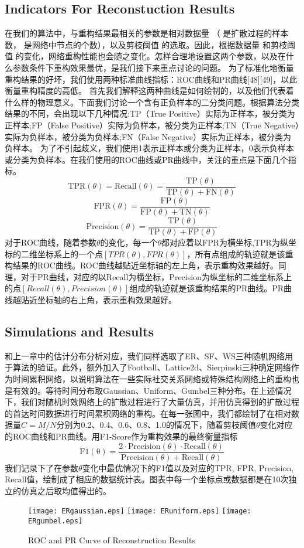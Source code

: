 \documentclass[journal]{IEEEtran}
\begin{document}
{	\subsection{Indicators For Reconstuction Results}
	在我们的算法中，与重构结果最相关的参数是相对数据量 （ 是扩散过程的样本数， 是网络中节点的个数），以及剪枝阈值 的选取。因此，根据数据量 和剪枝阈值 的变化，网络重构性能也会随之变化。怎样合理地设置这两个参数，以及在什么参数条件下重构效果最优，是我们接下来重点讨论的问题。
	为了标准化地衡量重构结果的好坏，我们使用两种标准曲线指标：ROC曲线和PR曲线[48][49]，以此衡量重构精度的高低。
	首先我们解释这两种曲线是如何绘制的，以及他们代表着什么样的物理意义。下面我们讨论一个含有正负样本的二分类问题。根据算法分类结果的不同，会出现以下几种情况:TP（True Positive）实际为正样本，被分类为正样本;FP（False Positive）实际为负样本，被分类为正样本;TN（True Negative）实际为负样本，被分类为负样本;FN（False Negative）实际为正样本，被分类为负样本。
	为了不引起歧义，我们使用1表示正样本或分类为正样本，0表示负样本或分类为负样本。在我们使用的ROC曲线或PR曲线中，关注的重点是下面几个指标。
	$$\mathrm{TPR}(\theta)=\mathrm{Recall}(\theta)=\frac{\mathrm{TP}(\theta)}{\mathrm{TP}(\theta)+\mathrm{FN}(\theta)}$$
	$$\mathrm{FPR}(\theta)=\frac{\mathrm{FP}(\theta)}{\mathrm{FP}(\theta)+\mathrm{TN}(\theta)}$$
	$$\mathrm{Precision}(\theta)=\frac{\mathrm{TP}(\theta)}{\mathrm{TP}(\theta)+\mathrm{FP}(\theta)}$$
	对于ROC曲线，随着参数$\theta$的变化，每一个$\theta$都对应着以FPR为横坐标,TPR为纵坐标的二维坐标系上的一个点$\left[TPR(\theta),FPR(\theta)\right]$，所有点组成的轨迹就是该重构结果的ROC曲线。ROC曲线越贴近坐标轴的左上角，表示重构效果越好。同理，对于PR曲线，对应的以Recall为横坐标，Precision为纵坐标的二维坐标系上的点$\left[Recall(\theta),Precision(\theta) \right]$组成的轨迹就是该重构结果的PR曲线。PR曲线越贴近坐标轴的右上角，表示重构效果越好。
	\subsection{Simulations and Results}
	和上一章中的估计分布分析对应，我们同样选取了ER、SF、WS三种随机网络用于算法的验证。此外，额外加入了Football、Lattice2d、Sierpinski三种确定网络作为时间累积网络，以说明算法在一些实际社交关系网络或特殊结构网络上的重构也是有效的。等待时间分布取Gaussian、Uniform、Gumbel三种分布。在上述情况下，我们对随机时效网络上的扩散过程进行了大量仿真，并用仿真得到的扩散过程的首达时间数据进行时间累积网络的重构。在每一张图中，我们都绘制了在相对数据量$C=M/N$分别为0.2、0.4、0.6、0.8、1.0的情况下，随着剪枝阈值$\theta$变化对应的ROC曲线和PR曲线。用F1-Score作为重构效果的最终衡量指标
	$$\mathrm{F1(\theta)}=\frac{2\cdot{\mathrm{Precision}(\theta)}\cdot{\mathrm{Recall}(\theta)}}{\mathrm{Precision}(\theta)+\mathrm{Recall}(\theta)}$$
	我们记录下了在参数$\theta$变化中最优情况下的F1值以及对应的TPR, FPR, Precision, Recall值，绘制成了相应的数据统计表。图表中每一个坐标点或数据都是在10次独立的仿真之后取均值得出的。
	\begin{figure}[t]
		\centering
		\texttt{[image: ERgaussian.eps]}
		\texttt{[image: ERuniform.eps]}
		\texttt{[image: ERgumbel.eps]}
		\caption{ROC and PR Curve of Reconstruction Results}
		\label{1}
	\end{figure}

}
\end{document}

